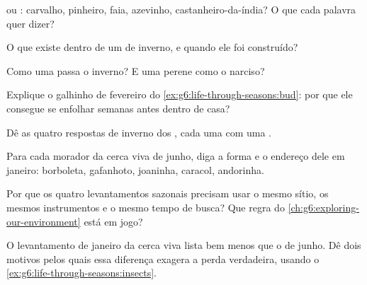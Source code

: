 \begin{exercise}[$\star$]\label{exo:g6:life-through-seasons:2}
 ou : carvalho, pinheiro, faia, azevinho,
castanheiro-da-índia? O que cada palavra quer dizer?
\end{exercise}

\begin{exercise}[$\star$]\label{exo:g6:life-through-seasons:3}
O que existe dentro de um  de inverno, e quando ele foi
construído?
\end{exercise}

\begin{exercise}[$\star$]\label{exo:g6:life-through-seasons:4}
Como uma  passa o inverno? E uma perene como o narciso?
\end{exercise}

\begin{exercise}[$\star$]\label{exo:g6:life-through-seasons:5}
Explique o galhinho de fevereiro do
\cref{ex:g6:life-through-seasons:bud}: por que ele consegue se
enfolhar semanas antes dentro de casa?
\end{exercise}

\begin{exercise}[$\star$]\label{exo:g6:life-through-seasons:6}
Dê as quatro respostas de inverno dos , cada uma com uma
.
\end{exercise}

\begin{exercise}[$\star\star$]\label{exo:g6:life-through-seasons:7}
Para cada morador da cerca viva de junho, diga a forma e o endereço
dele em janeiro: borboleta, gafanhoto, joaninha, caracol, andorinha.
\end{exercise}

\begin{exercise}[$\star\star$]\label{exo:g6:life-through-seasons:8}
Por que os quatro levantamentos sazonais precisam usar o mesmo sítio,
os mesmos instrumentos e o mesmo tempo de busca? Que regra do
\cref{ch:g6:exploring-our-environment} está em jogo?
\end{exercise}

\begin{exercise}[$\star\star$]\label{exo:g6:life-through-seasons:9}
O levantamento de janeiro da cerca viva lista bem menos 
que o de junho. Dê dois motivos pelos quais essa diferença exagera a
perda verdadeira, usando o \cref{ex:g6:life-through-seasons:insects}.
\end{exercise}

